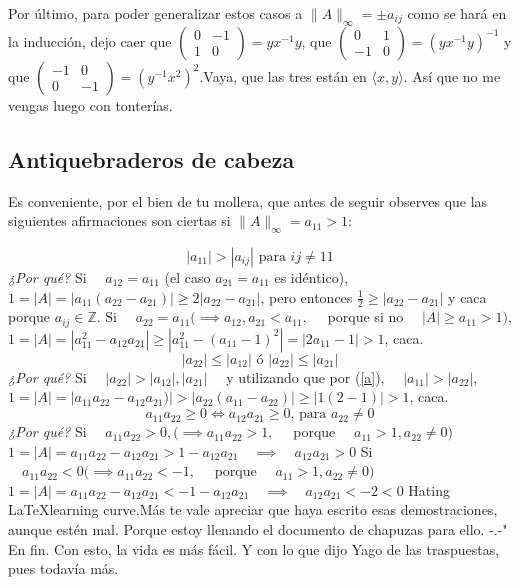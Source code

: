 \documentclass{article}
\newcommand\tab[1][0.6cm]{\hspace*{#1}}
\newcommand\nl{\newline\tab}
\begin{document}
	Por último, para poder generalizar estos casos a  $\|A\|_\infty = \pm a_{ij}$ como se hará en la inducción, dejo caer que
	$\begin{pmatrix}
	0 & -1 \\
	1 & 0 
	\end{pmatrix} = yx^{-1}y $, que $\begin{pmatrix}
	0 & 1 \\
	-1 & 0 
	\end{pmatrix} = \left(yx^{-1}y\right)^{-1}$ y que 
	$\begin{pmatrix}
	-1 & 0 \\
	0 & -1 
	\end{pmatrix} = \left(y^{-1}x^2\right)^2$.\nl  Vaya, que las tres están en $ \langle x, y \rangle$. Así que no me vengas luego con tonterías.\nl\nl
	
	
	
	\subsection{Antiquebraderos de cabeza}
	\tab Es conveniente, por el bien de tu mollera, que antes de seguir observes que las siguientes afirmaciones son ciertas si $\|A\|_\infty = a_{11} > 1$:
	
	\begin{equation}\label{a}
	|a_{11}| > |a_{ij}| \text{ para } ij \neq 11 
	\end{equation}
	\nl 
	\textit{¿Por qué?}\nl 
	Si $\quad a_{12} = a_{11}$ (el caso $a_{21} = a_{11}$ es idéntico),\nl 
	\tab$1 = |A| = |a_{11}(a_{22}-a_{21})| \geq 2|a_{22}-a_{21}|$, pero entonces $\frac{1}{2} \geq |a_{22}-a_{21}|$ y caca porque $a_{ij} \in\mathbb{Z} $.\nl
	Si $\quad a_{22} = a_{11} (\implies a_{12}, a_{21} < a_{11},\quad$ porque si no $\quad|A| \geq a_{11} > 1)$,\nl 
	\tab $1 = |A| = |a_{11}^2-a_{12}a_{21}| \geq |a_{11}^2-(a_{11}-1)^2| = |2a_{11} - 1 | > 1$, caca.\nl\nl
	\begin{equation}\label{b}
	|a_{22}| \leq |a_{12}| \text{ ó } |a_{22}| \leq|a_{21}|
	\end{equation}
	\nl 
	\textit{¿Por qué?}\nl 
	 Si $\quad|a_{22}| > |a_{12}|, |a_{21}|\quad$  y utilizando que por (\ref{a}), $\quad |a_{11}| > |a_{22}|$, \nl 
	\tab $1 = |A| = |a_{11}a_{22}-a_{12}a_{21})| > |a_{22}(a_{11}-a_{22})| \geq |1(2 - 1)| > 1 $, caca.\nl\nl
	\begin{equation}\label{c}
	a_{11}a_{22}\geq 0 \iff a_{12}a_{21}\geq 0\text{, para } a_{22} \neq 0
	\end{equation}
	\nl 
	\textit{¿Por qué?}\nl 
	Si $\quad a_{11}a_{22} > 0, (\implies a_{11}a_{22} > 1,\quad$ porque $\quad a_{11} > 1, a_{22} \neq 0)$\nl\tab 
	$1 = |A| = a_{11}a_{22} - a_{12}a_{21} > 1 - a_{12}a_{21} \quad\implies\quad a_{12}a_{21} > 0$\nl
	Si $\quad a_{11}a_{22} < 0 (\implies a_{11}a_{22} < - 1,\quad$ porque $\quad a_{11} > 1, a_{22} 	\neq 0)$\nl\tab 
	$1 = |A| = a_{11}a_{22} - a_{12}a_{21} < - 1 - a_{12}a_{21} \quad\implies\quad a_{12}a_{21} < -2 < 0$\nl\nl 
	Hating \LaTeX\space  learning curve.\nl	Más te vale apreciar que haya escrito esas demostraciones, aunque estén mal. Porque estoy llenando el documento de chapuzas para ello. -.-"\nl 	
	En fin. Con esto, la vida es más fácil. Y con lo que dijo Yago de las traspuestas, pues todavía más.\nl
\end{document}

